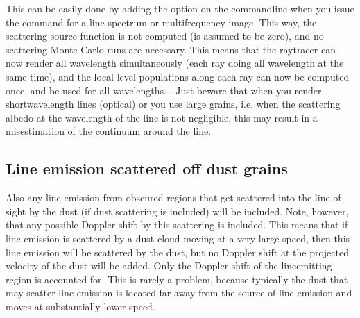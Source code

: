 \documentclass[letterpaper,10pt,english]{sphinxmanual}
\begin{document}
 This can be easily done by adding the 
option on the command\sphinxhyphen{}line when you issue the command for a line spectrum or
multi\sphinxhyphen{}frequency image. This way, the scattering source function is not
computed (is assumed to be zero), and no scattering Monte Carlo runs are
necessary. This means that the ray\sphinxhyphen{}tracer can now render all wavelength
simultaneously (each ray doing all wavelength at the same time), and the
local level populations along each ray can now be computed once, and be used
for all wavelengths. . Just beware that when you render
short\sphinxhyphen{}wavelength lines (optical) or you use large grains, i.e. when the
scattering albedo at the wavelength of the line is not negligible, this may
result in a mis\sphinxhyphen{}estimation of the continuum around the line.


\subsection{Line emission scattered off dust grains}
\label{\detokenize{lineradtrans:line-emission-scattered-off-dust-grains}}\label{\detokenize{lineradtrans:sec-line-scat-off-dust}}

Also any line emission from obscured regions that get scattered into the
line of sight by the dust (if dust scattering is included) will be
included. Note, however, that any possible Doppler shift  by
this scattering is  included. This means that if line emission is
scattered by a dust cloud moving at a very large speed, then this line
emission will be scattered by the dust, but no Doppler shift at the
projected velocity of the dust will be added. Only the Doppler shift of the
line\sphinxhyphen{}emitting region is accounted for. This is rarely a problem, because
typically the dust that may scatter line emission is located far away from
the source of line emission and moves at substantially lower speed.
\end{document}
